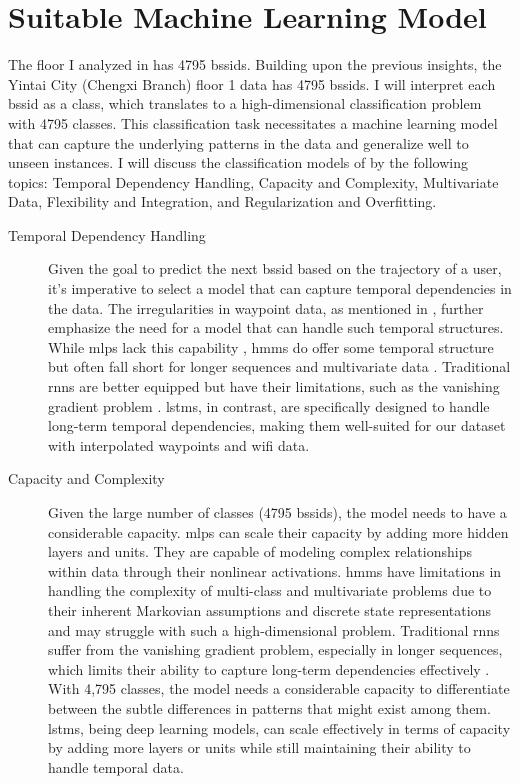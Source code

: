 \chapter{Suitable Machine Learning Model}\label{ch:discuss-ml}

The floor I analyzed in  has 4795 \acp{bssid}.
Building upon the previous insights, the Yintai City (Chengxi Branch) floor 1 data has 4795 \acp{bssid}.
I will interpret each \ac{bssid} as a class, which translates to a high-dimensional classification problem with 4795 classes.
This classification task necessitates a machine learning model that can capture the underlying patterns in the data and generalize well to unseen instances.
I will discuss the classification models of  by the following topics: Temporal Dependency Handling, Capacity and Complexity, Multivariate Data, Flexibility and Integration, and Regularization and Overfitting. 

\begin{description}
\item[Temporal Dependency Handling]
Given the goal to predict the next \ac{bssid} based on the trajectory of a user, it's imperative to select a model that can capture temporal dependencies in the data.
The irregularities in waypoint data, as mentioned in , further emphasize the need for a model that can handle such temporal structures.
While \acp{mlp} lack this capability \cite{mlp_and_nn}, \acp{hmm} do offer some temporal structure but often fall short for longer sequences and multivariate data \cite{hmm-rabiner-1989}.
Traditional \acp{rnn} are better equipped but have their limitations, such as the vanishing gradient problem \cite{rnn_difficulties_2013}.
\acp{lstm}, in contrast, are specifically designed to handle long-term temporal dependencies, making them well-suited for our dataset with interpolated waypoints and \ac{wifi} data.
\end{description}

\begin{description}
\item[Capacity and Complexity]
Given the large number of classes (4795 \acp{bssid}), the model needs to have a considerable capacity.
\acp{mlp} can scale their capacity by adding more hidden layers and units.
They are capable of modeling complex relationships within data through their nonlinear activations.
\acp{hmm} have limitations in handling the complexity of multi-class and multivariate problems due to their inherent Markovian assumptions and discrete state representations and may struggle with such a high-dimensional problem.
Traditional \acp{rnn} suffer from the vanishing gradient problem, especially in longer sequences, which limits their ability to capture long-term dependencies effectively \cite{rnn_difficulties_2013}.
With 4,795 classes, the model needs a considerable capacity to differentiate between the subtle differences in patterns that might exist among them. 
\acp{lstm}, being deep learning models, can scale effectively in terms of capacity by adding more layers or units while still maintaining their ability to handle temporal data.
\end{description}

